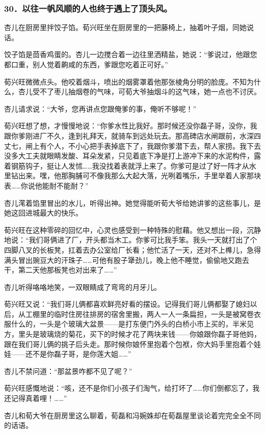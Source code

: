 \subsubsection*{30．以往一帆风顺的人也终于遇上了顶头风。}
\par 杏儿在厨房里拌饺子馅。荀兴旺坐在厨房里的一把藤椅上，抽着叶子烟，同她说话。
\par 饺子馅是茴香鸡蛋的。杏儿一边搅合着一边往里洒精盐，她说：“爹说过，他跟您都口重，别人觉着齁咸的东西，爹跟您吃着正可好。”
\par 荀兴旺微微点头。他咬着烟斗，喷出的烟雾罩着他那张棱角分明的脸庞。不知为什么，杏儿受不了枣儿抽烟卷的气味，可荀大爷抽烟斗的这气味，她一点也不讨厌。
\par 杏儿请求说：“大爷，您再讲点您跟俺爹的事，俺听不够呢！”
\par 荀兴旺想了想，才慢慢地说：“你爹水性比我好。那时候还没你磊子哥，没你，我跟你爹刚进厂不久，逢到礼拜天，就骑车到远处玩去。那高碑店水闸跟前，水深四丈七，闸上有个人，不小心把手表掉底下了，我跟你爹潜下去，帮人家捞。我下去没多大工夫就眼睛发酸、耳朵发紧，只见着底下净是打上游冲下来的水泥构件，露着钢筋钩子，挺让人发怵……我没找着表就浮上来了。你爹可是过了好一阵才从水里钻出来。嘿，他那胸脯可不像我那么大起大落，光咧着嘴乐，手里举着人家那块表……你说他能耐不能耐？”
\par 杏儿滗着馅里冒出的水儿，听得出神。她觉得能听荀大爷给她讲爹的这些事儿，是她这回进城最大的快乐。
\par 荀兴旺在这种零碎的回忆中，心灵也感受到一种特殊的慰藉。他又想出一段，沉静地说：“我们哥俩进了厂，开头都当木工。你爹可比我手笨。我头一天就打出了个四脚八叉的长板凳，扛着去办公室给厂长看；他忙活了一天，还对不上榫儿，急得满头冒出豌豆大的汗珠子……可他有股子犟劲儿，晚上他不睡觉，偷偷地又跑去干，第二天他那板凳也对出来了……”
\par 杏儿听得咯咯地笑，一双眼睛成了弯弯的月牙儿。
\par 荀兴旺又说：“我们哥儿俩都喜欢鲜亮好看的摆设。记得我们哥儿俩都娶了媳妇以后，从工棚里的临时住房往排房的宿舍里搬，两人一人一条扁担，一头是被窝卷衣服什么的，一头是个玻璃大盆景——是打东便门外头的白桥小市上买的，半米见方，里头是玻璃烧的菊花，买下的时候才花了两块来钱——你娘跟你磊子哥他妈，跟在我们哥儿俩的挑子后头走。那时候你娘怀里抱着个包袱，你大妈手里抱着个娃娃——还不是你磊子哥，是你莲大姐……”
\par 杏儿不禁问道：“那盆景咋都不见了呢？”
\par 荀兴旺感慨地说：“咳，还不是你们小孩子们淘气，给打坏了……你们倒都忘了，我还记得真着哩！……”
\par 杏儿和荀大爷在厨房里这么聊着，荀磊和冯婉姝却在荀磊屋里谈论着完完全全不同的话语。
